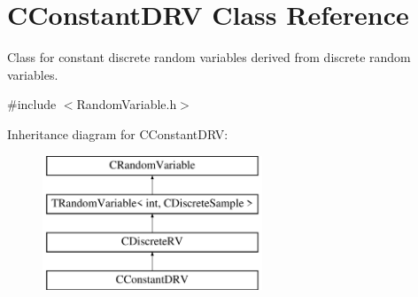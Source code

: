 \hypertarget{class_c_constant_d_r_v}{\section{C\-Constant\-D\-R\-V Class Reference}
\label{class_c_constant_d_r_v}
}


Class for constant discrete random variables derived from discrete random variables.  




{\ttfamily \#include $<$Random\-Variable.\-h$>$}

Inheritance diagram for C\-Constant\-D\-R\-V\-:\begin{figure}[H]
\begin{center}
\leavevmode
\includegraphics[height=4.000000cm]{class_c_constant_d_r_v}
\end{center}
\end{figure}
